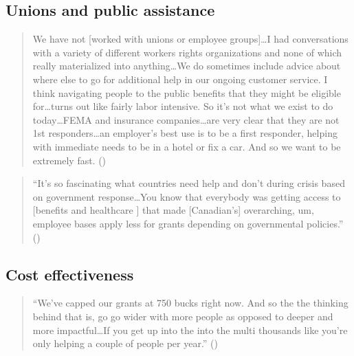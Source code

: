 \documentclass[
  11pt,
  oneside]{article}
\begin{document}
\subsection{Unions and public assistance}\label{unions-and-public-assistance}

\begin{quote}
We have not {[}worked with unions or employee groups{]}\ldots I had conversations with a variety of different workers rights organizations and none of which really materialized into anything\ldots We do sometimes include advice about where else to go for additional help in our ongoing customer service. I think navigating people to the public benefits that they might be eligible for\ldots turns out like fairly labor intensive. So it's not what we exist to do today\ldots FEMA and insurance companies\ldots are very clear that they are not 1st responders\ldots an employer's best use is to be a first responder, helping with immediate needs to be in a hotel or fix a car. And so we want to be extremely fast. ()
\end{quote}

\begin{quote}
``It's so fascinating what countries need help and don't during crisis based on government response\ldots You know that everybody was getting access to {[}benefits and healthcare {]} that made {[}Canadian's{]} overarching, um, employee bases apply less for grants depending on governmental policies.'' ()
\end{quote}

\subsection{Cost effectiveness}\label{cost-effectiveness-1}

\begin{quote}
``We've capped our grants at 750 bucks right now. And so the the thinking behind that is, go go wider with more people as opposed to deeper and more impactful\ldots If you get up into the into the multi thousands like you're only helping a couple of people per year.'' ()
\end{quote}
\end{document}
